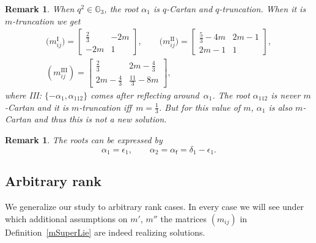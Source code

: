 \documentclass[pdftex]{sigma}%
\numberwithin{equation}{section}
\newtheorem{oss}[teo]{Remark} }
\newcommand{\f}{\mathsf{f}}
\begin{document}
\begin{oss}\label{Heck5trunc}
When $q^2\in \mathbb{G}_3$, the root $\alpha_1$ is $q$-Cartan \textit{and} $q$-truncation.
When it is $m$-truncation we get
	\begin{gather*} \big(m_{ij}^{\mathrm{I}}\big)= \begin{bmatrix}
 \frac{2}{3} &-2m\\
 -2m & 1
\end{bmatrix}, \qquad
\big(m_{ij}^{\mathrm{II}}\big)= \begin{bmatrix}
 \frac{5}{3} -4m & 2m-1\\
 2m-1 & 1
\end{bmatrix}, \\
(m_{ij}^{\mathrm{III}})= \begin{bmatrix}
 \frac{2}{3} & 2m-\frac{4}{3}\\
 2m-\frac{4}{3} & \frac{11}{3}-8m
\end{bmatrix},
\end{gather*}
where III: $\lbrace -\alpha_{1}, \alpha_{112}\rbrace$ comes after reflecting around~$\alpha_1$.
The root $\alpha_{112}$ is never $m$-Cartan and it is $m$-truncation iff~$m=\frac{1}{3}$.
 But for this value of $m$, $\alpha_1$ is also $m$-Cartan and thus this is \emph{not} a new solution.
\end{oss}

\begin{oss} The roots can be expressed by \[ \alpha_1 =\epsilon_1, \qquad \alpha_2 = \alpha_\f = \delta_1 - \epsilon_1.\]
\end{oss}

\subsection{Arbitrary rank}\label{subsec_rankNsuper}
We generalize our study to arbitrary rank cases.
In every case we will see under which additional assumptions on $m'$, $m''$ the matrices $(m_{ij})$ in Definition~\ref{mSuperLie} are indeed realizing solutions.
\end{document}
